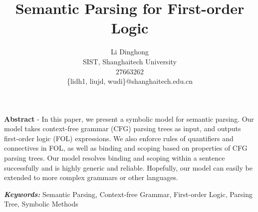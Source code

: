 \documentclass{article}
\title{Semantic Parsing for First-order Logic}
\author{
	Li Dinghong\\
	SIST, Shanghaitech University\\
	27663262\\
	\{lidh1, liujd, wudi\}@shanghaitech.edu.cn
}
\begin{document}
{
	\newpage
	\maketitle

	\textbf{Abstract} - {In this paper, we present a symbolic model for semantic parsing. Our model takes context-free grammar (CFG) parsing trees as input, and outputs first-order logic (FOL) expressions. We also enforce rules of quantifiers and connectives in FOL, as well as binding and scoping based on properties of CFG parsing trees. Our model resolves binding and scoping within a sentence successfully and is highly generic and reliable. Hopefully, our model can easily be extended to more complex grammars or other languages. }

	\vspace{5pt}
	\textbf{\emph{Keywords:}} {Semantic Parsing, Context-free Grammar, First-order Logic, Parsing Tree, Symbolic Methods}

	\tableofcontents
}
\end{document}
